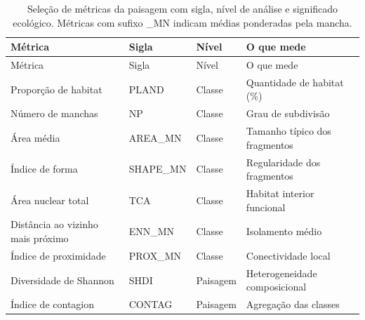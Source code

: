 \documentclass[
  portuguese,
  11pt,
  a4paper,
  open=any]{scrbook}
\begin{document}
\begin{longtable}[]{@{}
  >{\raggedright\arraybackslash}p{}
  >{\raggedright\arraybackslash}p{}
  >{\raggedright\arraybackslash}p{}
  >{\raggedright\arraybackslash}p{}@{}}
\caption{Seleção de métricas da paisagem com sigla, nível de análise e
significado ecológico. Métricas com sufixo \_MN indicam médias
ponderadas pela mancha.}\label{tbl-metricas-selecionadas}\tabularnewline
\toprule\noalign{}
\begin{minipage}[b]{\linewidth}\raggedright
Métrica
\end{minipage} & \begin{minipage}[b]{\linewidth}\raggedright
Sigla
\end{minipage} & \begin{minipage}[b]{\linewidth}\raggedright
Nível
\end{minipage} & \begin{minipage}[b]{\linewidth}\raggedright
O que mede
\end{minipage} \\
\midrule\noalign{}
\endfirsthead
\toprule\noalign{}
\begin{minipage}[b]{\linewidth}\raggedright
Métrica
\end{minipage} & \begin{minipage}[b]{\linewidth}\raggedright
Sigla
\end{minipage} & \begin{minipage}[b]{\linewidth}\raggedright
Nível
\end{minipage} & \begin{minipage}[b]{\linewidth}\raggedright
O que mede
\end{minipage} \\
\midrule\noalign{}
\endhead
\bottomrule\noalign{}
\endlastfoot
Proporção de habitat & PLAND & Classe & Quantidade de habitat (\%) \\
Número de manchas & NP & Classe & Grau de subdivisão \\
Área média & AREA\_MN & Classe & Tamanho típico dos fragmentos \\
Índice de forma & SHAPE\_MN & Classe & Regularidade dos fragmentos \\
Área nuclear total & TCA & Classe & Habitat interior funcional \\
Distância ao vizinho mais próximo & ENN\_MN & Classe & Isolamento
médio \\
Índice de proximidade & PROX\_MN & Classe & Conectividade local \\
Diversidade de Shannon & SHDI & Paisagem & Heterogeneidade
composicional \\
Índice de contagion & CONTAG & Paisagem & Agregação das classes \\
\end{longtable}
\end{document}
